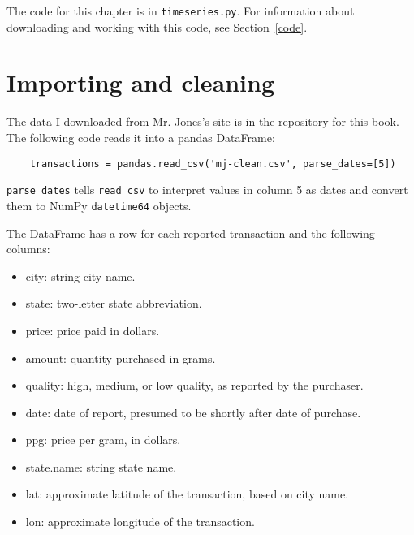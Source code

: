 \documentclass[12pt]{book}
\begin{document}
The code for this chapter is in {\tt timeseries.py}.  For information
about downloading and working with this code, see Section~\ref{code}.


\section{Importing and cleaning}

The data I downloaded from
Mr. Jones's site is in the repository for this book.
The following code reads it into a
pandas DataFrame:

\begin{verbatim}
    transactions = pandas.read_csv('mj-clean.csv', parse_dates=[5])
\end{verbatim}

\verb"parse_dates" tells \verb"read_csv" to interpret values in column 5
as dates and convert them to NumPy {\tt datetime64} objects.

The DataFrame has a row for each reported transaction and 
the following columns:

\begin{itemize}

\item city: string city name.

\item state: two-letter state abbreviation.

\item price: price paid in dollars.

\item amount: quantity purchased in grams.

\item quality: high, medium, or low quality, as reported by the purchaser.

\item date: date of report, presumed to be shortly after date of purchase.

\item ppg: price per gram, in dollars.

\item state.name: string state name.

\item lat: approximate latitude of the transaction, based on city name.

\item lon: approximate longitude of the transaction.

\end{itemize}
\end{document}
